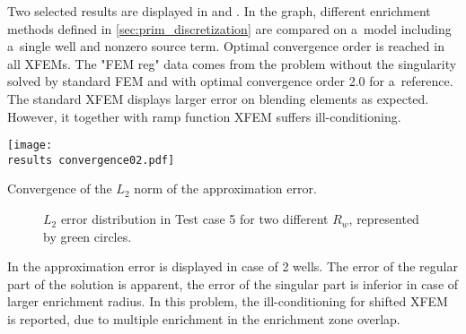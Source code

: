 Two selected results are displayed in  and .
In the graph, different enrichment methods defined in \ref{sec:prim_discretization} are compared
on a~model including a~single well and nonzero source term.
Optimal convergence order is reached in all XFEMs.
The "FEM reg" data comes from the problem without the singularity solved by standard FEM and with optimal convergence order 2.0 for a~reference.
The standard XFEM displays larger error on blending elements as expected.
However, it together with ramp function XFEM suffers ill-conditioning.
\begin{graph}[!htb]
  \centering    
  \texttt{[image: \\results convergence02.pdf]}
  \caption[Convergence comparison graph.]{Convergence of the $L_2$ norm of the approximation error.}
  \label{graph:convergence02}
\end{graph}

\begin{figure}[!htb]
  \centering
  \caption[Error distribution in Test case 5.]{$L_2$ error distribution in Test case 5 for two different $R_w$,
  represented by green circles.}
  \label{fig:error_distribution_test5}
\end{figure}
In  the approximation error is displayed
in case of 2 wells. The error of the regular part of the solution is apparent, 
the error of the singular part is inferior in case of larger enrichment radius.
In this problem, the ill-conditioning for shifted XFEM is reported, due
to multiple enrichment in the enrichment zone overlap.



